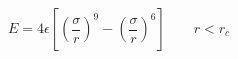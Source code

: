 


$$
 E = 4 \epsilon \left[ \left(\frac{\sigma}{r}\right)^{9} - 
                       \left(\frac{\sigma}{r}\right)^6 \right]
                       \qquad r < r_c
$$


